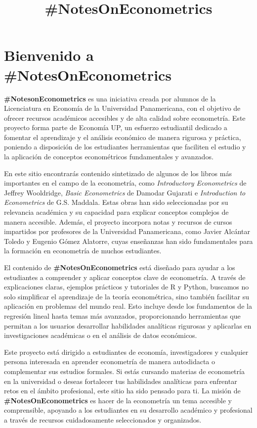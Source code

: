 \documentclass[
]{book}
\title{\#NotesOnEconometrics}
\author{}
\date{\vspace{-2.5em}}
\begin{document}
\maketitle

{
\setcounter{tocdepth}{1}
\tableofcontents
}
\hypertarget{bienvenido-a-notesoneconometrics}{%
\chapter{Bienvenido a \#NotesOnEconometrics}\label{bienvenido-a-notesoneconometrics}}

\textbf{\#NotesonEconometrics} es una iniciativa creada por alumnos de la Licenciatura en Economía de la Universidad Panamericana, con el objetivo de ofrecer recursos académicos accesibles y de alta calidad sobre econometría. Este proyecto forma parte de Economía UP, un esfuerzo estudiantil dedicado a fomentar el aprendizaje y el análisis económico de manera rigurosa y práctica, poniendo a disposición de los estudiantes herramientas que faciliten el estudio y la aplicación de conceptos econométricos fundamentales y avanzados.

En este sitio encontrarás contenido sintetizado de algunos de los libros más importantes en el campo de la econometría, como \emph{Introductory Econometrics} de Jeffrey Wooldridge, \emph{Basic Econometrics} de Damodar Gujarati e \emph{Introduction to Econometrics} de G.S. Maddala. Estas obras han sido seleccionadas por su relevancia académica y su capacidad para explicar conceptos complejos de manera accesible. Además, el proyecto incorpora notas y recursos de cursos impartidos por profesores de la Universidad Panamericana, como Javier Alcántar Toledo y Eugenio Gómez Alatorre, cuyas enseñanzas han sido fundamentales para la formación en econometría de muchos estudiantes.

El contenido de \textbf{\#NotesOnEconometrics} está diseñado para ayudar a los estudiantes a comprender y aplicar conceptos clave de econometría. A través de explicaciones claras, ejemplos prácticos y tutoriales de R y Python, buscamos no solo simplificar el aprendizaje de la teoría econométrica, sino también facilitar su aplicación en problemas del mundo real. Esto incluye desde los fundamentos de la regresión lineal hasta temas más avanzados, proporcionando herramientas que permitan a los usuarios desarrollar habilidades analíticas rigurosas y aplicarlas en investigaciones académicas o en el análisis de datos económicos.

Este proyecto está dirigido a estudiantes de economía, investigadores y cualquier persona interesada en aprender econometría de manera autodidacta o complementar sus estudios formales. Si estás cursando materias de econometría en la universidad o deseas fortalecer tus habilidades analíticas para enfrentar retos en el ámbito profesional, este sitio ha sido pensado para ti. La misión de \textbf{\#NotesOnEconometrics} es hacer de la econometría un tema accesible y comprensible, apoyando a los estudiantes en su desarrollo académico y profesional a través de recursos cuidadosamente seleccionados y organizados.
\end{document}
